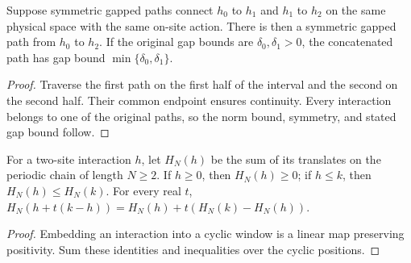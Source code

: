 \begin{lemma}
    \label{thm:spt_common_space_path_concatenation}
    \leanok
    Suppose symmetric gapped paths connect $h_0$ to $h_1$ and $h_1$
    to $h_2$ on the same physical space with the same on-site action.
    There is then a symmetric gapped path from $h_0$ to $h_2$.
    If the original gap bounds are $\delta_0,\delta_1>0$, the
    concatenated path has gap bound $\min\{\delta_0,\delta_1\}$.
\end{lemma}

\begin{proof}\leanok
    Traverse the first path on the first half of the interval and
    the second on the second half.  Their common endpoint ensures
    continuity.  Every interaction belongs to one of the original
    paths, so the norm bound, symmetry, and stated gap bound follow.
\end{proof}

\begin{lemma}
    \label{thm:spt_periodic_hamiltonian_order}
    \leanok
    For a two-site interaction $h$, let $H_N(h)$ be the sum of its
    translates on the periodic chain of length $N\ge2$.
    If $h\ge0$, then $H_N(h)\ge0$; if $h\le k$, then
    $H_N(h)\le H_N(k)$.  For every real $t$,
    $H_N(h+t(k-h))=H_N(h)+t(H_N(k)-H_N(h))$.
\end{lemma}

\begin{proof}\leanok
    Embedding an interaction into a cyclic window is a linear map
    preserving positivity.  Sum these identities and inequalities over
    the cyclic positions.
\end{proof}

